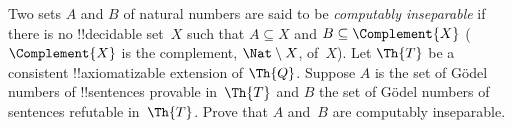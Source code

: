 \documentclass[../../../include/open-logic-section]{subfiles}
\begin{document}
\begin{prob}
Two sets $A$ and $B$ of natural numbers are said to be
\emph{computably inseparable} if there is no !!{decidable} set~$X$
such that $A \subseteq X$ and $B \subseteq \Complement{X}$
($\Complement{X}$ is the complement, $\Nat \setminus X$, of~$X$). Let
$\Th{T}$ be a consistent !!{axiomatizable} extension of $\Th{Q}$.
Suppose $A$ is the set of G\"odel numbers of !!{sentence}s provable
in~$\Th{T}$ and $B$ the set of G\"odel numbers of sentences
refutable in~$\Th{T}$. Prove that $A$ and~$B$ are computably
inseparable.
\end{prob}
\end{document}
